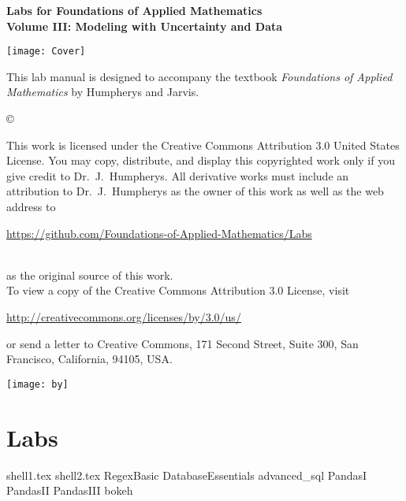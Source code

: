 \documentclass[nociteref]{SIAM-GH-book}
\begin{document}

\thispagestyle{empty} %

\begin{center}
{\huge \bf Labs for Foundations of Applied Mathematics} \\
\vspace{5mm}
{\Large \bf Volume III: Modeling with Uncertainty and Data}
\vspace{20mm}

\texttt{[image: Cover]}
\end{center}
\frontmatter



\begin{thepreface} %

This lab manual is designed to accompany the textbook \emph{Foundations of Applied Mathematics} by Humpherys and Jarvis.

\vfill
\copyright{This work is licensed under the Creative Commons Attribution 3.0 United States
License.  You may copy, distribute, and display this copyrighted work only if you give
credit to Dr.~J.~Humpherys. All derivative works must include an attribution to Dr.~J.~Humpherys as the owner of this work as well as the web address to
\\\centerline{\url{https://github.com/Foundations-of-Applied-Mathematics/Labs}}\\as the original source of this work.
\\To view a copy of the Creative Commons Attribution 3.0 License, visit
\\\centerline{\url{http://creativecommons.org/licenses/by/3.0/us/}} or send a letter to Creative Commons, 171 Second Street, Suite 300, San Francisco, California, 94105, USA.}

\vfill
\centering\texttt{[image: by]}
\vfill
\end{thepreface}

\setcounter{tocdepth}{1}
\tableofcontents

\mainmatter %

\part{Labs}
{shell1.tex}
{shell2.tex}
{RegexBasic}
{DatabaseEssentials}
{advanced_sql}
{PandasI}
{PandasII}
{PandasIII}
{bokeh}
\end{document}
